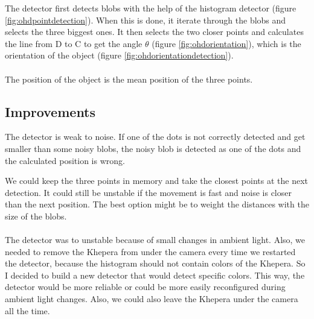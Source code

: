     The detector first detects blobs with the help of the histogram 
    detector (figure \ref{fig:ohdpointdetection}). When this is done, it 
    iterate through the blobs and selects 
    the three biggest ones.  It then selects the two closer points and 
    calculates the line from D to C to get the angle $\theta$ (figure
    \ref{fig:ohdorientation}), which is the 
    orientation of the object (figure \ref{fig:ohdorientationdetection}).
    \\
    \\
    The position of the object is the mean position of the three points.

\subsection{Improvements}
\label{sec:ohd:improvments}

    The detector is weak to noise. If one of the dots is not correctly 
    detected and get smaller than some noisy blobs, the noisy blob is 
    detected as one of the dots and the calculated position is wrong.

    We could keep the three points in memory and take the closest points 
    at the next detection. It could still be unstable if the movement is 
    fast and noise is closer than the next position. The best option might 
    be to weight the distances with the size of the blobs. 
    \\
    \\
    The detector was to unstable because of small changes in ambient light.
    Also, we needed to remove the Khepera from under the camera every time 
    we restarted the detector, because the histogram should not contain 
    colors of the Khepera. So I decided to build a new detector that would 
    detect specific colors. This way, the detector would be more reliable 
    or could be more easily reconfigured during ambient light changes. 
    Also, we could also leave the Khepera under the camera all the time. 
    \\
    \\

